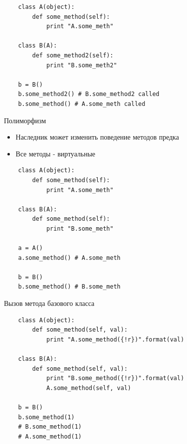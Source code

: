 \documentclass{article}
\begin{document}
{
\Large
\vspace{15pt}
\begin{lstlisting}
    class A(object):
        def some_method(self):
            print "A.some_meth"

    class B(A):
        def some_method2(self):
            print "B.some_meth2"

    b = B() 
    b.some_method2() # B.some_method2 called
    b.some_method() # A.some_meth called
\end{lstlisting}
}
\newpage

\begin{center} Полиморфизм \end{center}
\begin{itemize}
    \item Наследник может изменить поведение методов предка
    \item Все методы - виртуальные
\end{itemize}
{
\Large
\vspace{15pt}
\begin{lstlisting}
    class A(object):
        def some_method(self):
            print "A.some_meth"

    class B(A):
        def some_method(self):
            print "B.some_meth"

    a = A() 
    a.some_method() # A.some_meth

    b = B() 
    b.some_method() # B.some_meth
\end{lstlisting}
}
\newpage

\begin{center} Вызов метода базового класса \end{center}
\vspace{15pt}
\begin{lstlisting}
    class A(object):
        def some_method(self, val):
            print "A.some_method({!r})".format(val)

    class B(A):
        def some_method(self, val):
            print "B.some_method({!r})".format(val)
            A.some_method(self, val)

    b = B() 
    b.some_method(1)
    # B.some_method(1)
    # A.some_method(1)
\end{lstlisting}
\newpage
\end{document}
